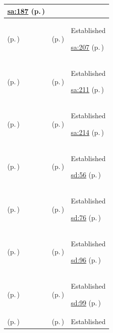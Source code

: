 \begin{longtable}{|>{\raggedright\arraybackslash}p{0.27\TableWidth}|>{\raggedright\arraybackslash}p{0.27\TableWidth}|>{\raggedright\arraybackslash}p{0.46\TableWidth}|}
 \hyperref[rad:sa:183]{sa:187} (p.\,\pageref{rad:sa:183})\\\hline
\nameref{service:secure-clinical-message-dispatch} (p.\,\pageref{service:secure-clinical-message-dispatch}) & \nameref{feature:feat-sa-27} (p.\,\pageref{feature:feat-sa-27}) & Established

 \hyperref[rad:sa:199]{sa:207} (p.\,\pageref{rad:sa:199})\\\hline
\nameref{service:communication-delivery-status-query} (p.\,\pageref{service:communication-delivery-status-query}) & \nameref{feature:feat-sa-28} (p.\,\pageref{feature:feat-sa-28}) & Established

 \hyperref[rad:sa:199]{sa:211} (p.\,\pageref{rad:sa:199})\\\hline
\nameref{service:communication-audit-query} (p.\,\pageref{service:communication-audit-query}) & \nameref{feature:feat-sa-29} (p.\,\pageref{feature:feat-sa-29}) & Established

 \hyperref[rad:sa:199]{sa:214} (p.\,\pageref{rad:sa:199})\\\hline
\nameref{service:primary-care-summary-ingress} (p.\,\pageref{service:primary-care-summary-ingress}) & \nameref{feature:feat-sd-01} (p.\,\pageref{feature:feat-sd-01}) & Established

 \hyperref[rad:sd:51]{sd:56} (p.\,\pageref{rad:sd:51})\\\hline
\nameref{service:acute-admission-dossier-query} (p.\,\pageref{service:acute-admission-dossier-query}) & \nameref{feature:feat-sd-04} (p.\,\pageref{feature:feat-sd-04}) & Established

 \hyperref[rad:sd:71]{sd:76} (p.\,\pageref{rad:sd:71})\\\hline
\nameref{service:ed-triage-stream-ingress} (p.\,\pageref{service:ed-triage-stream-ingress}) & \nameref{feature:feat-sd-05} (p.\,\pageref{feature:feat-sd-05}) & Established

 \hyperref[rad:sd:91]{sd:96} (p.\,\pageref{rad:sd:91})\\\hline
\nameref{service:emergency-fast-path-lhr-query} (p.\,\pageref{service:emergency-fast-path-lhr-query}) & \nameref{feature:feat-sd-06} (p.\,\pageref{feature:feat-sd-06}) & Established

 \hyperref[rad:sd:91]{sd:99} (p.\,\pageref{rad:sd:91})\\\hline
\nameref{service:ward-round-clinical-briefing-query} (p.\,\pageref{service:ward-round-clinical-briefing-query}) & \nameref{feature:feat-sd-07} (p.\,\pageref{feature:feat-sd-07}) & Established


\end{longtable}
